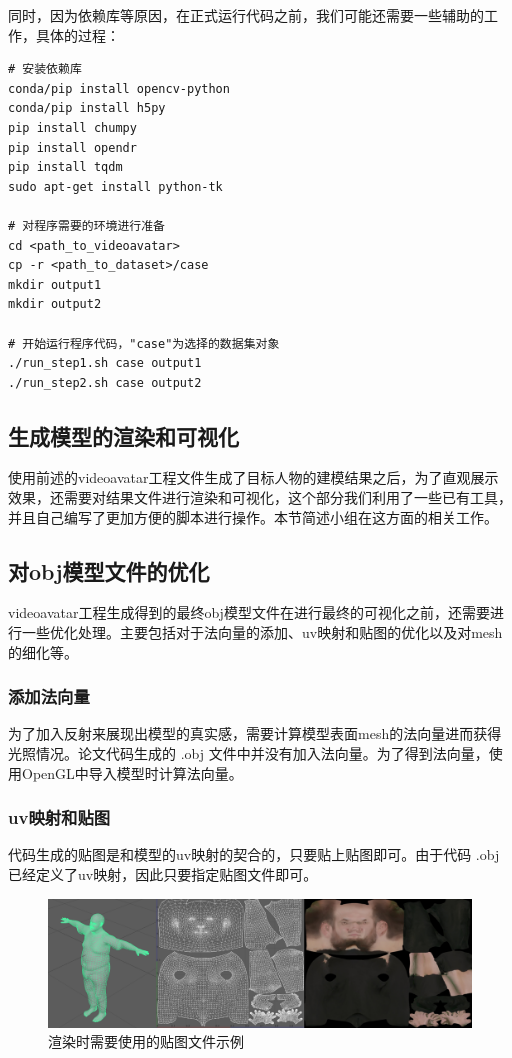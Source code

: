 \documentclass{article}
\begin{document}
同时，因为依赖库等原因，在正式运行代码之前，我们可能还需要一些辅助的工作，具体的过程：

\begin{lstlisting} 
# 安装依赖库
conda/pip install opencv-python
conda/pip install h5py
pip install chumpy
pip install opendr
pip install tqdm
sudo apt-get install python-tk

# 对程序需要的环境进行准备
cd <path_to_videoavatar>
cp -r <path_to_dataset>/case
mkdir output1
mkdir output2

# 开始运行程序代码，"case"为选择的数据集对象
./run_step1.sh case output1
./run_step2.sh case output2
\end{lstlisting}

\subsection{生成模型的渲染和可视化}
使用前述的videoavatar工程文件生成了目标人物的建模结果之后，为了直观展示效果，还需要对结果文件进行渲染和可视化，这个部分我们利用了一些已有工具，并且自己编写了更加方便的脚本进行操作。本节简述小组在这方面的相关工作。

\subsection{对obj模型文件的优化}
videoavatar工程生成得到的最终obj模型文件在进行最终的可视化之前，还需要进行一些优化处理。主要包括对于法向量的添加、uv映射和贴图的优化以及对mesh的细化等。
\subsubsection{添加法向量}
为了加入反射来展现出模型的真实感，需要计算模型表面mesh的法向量进而获得光照情况。论文代码生成的 .obj 文件中并没有加入法向量。为了得到法向量，使用OpenGL中导入模型时计算法向量。
\subsubsection{uv映射和贴图}
代码生成的贴图是和模型的uv映射的契合的，只要贴上贴图即可。由于代码 .obj 已经定义了uv映射，因此只要指定贴图文件即可。
\begin{figure}[H]
	\centering
	\includegraphics[width=16cm]{figure/uv}
	\caption{渲染时需要使用的贴图文件示例}
\end{figure}
\end{document}
